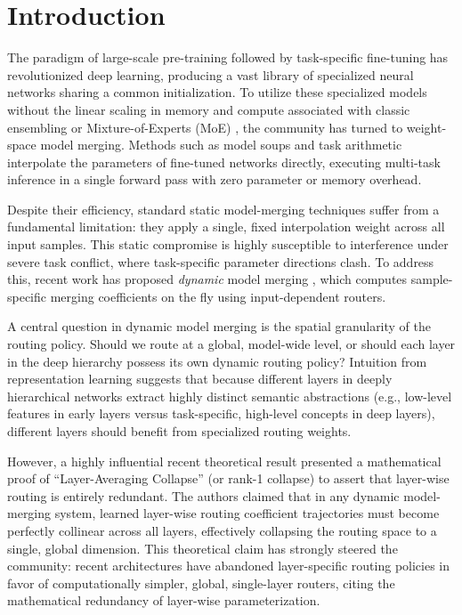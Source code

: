 \section{Introduction}
\label{sec:intro}

The paradigm of large-scale pre-training followed by task-specific fine-tuning has revolutionized deep learning, producing a vast library of specialized neural networks sharing a common initialization. To utilize these specialized models without the linear scaling in memory and compute associated with classic ensembling or Mixture-of-Experts (MoE) \cite{shazeer2017outrageously, fedus2022switch}, the community has turned to weight-space model merging. Methods such as model soups \cite{wortsman2022model} and task arithmetic \cite{ilharco2022editing} interpolate the parameters of fine-tuned networks directly, executing multi-task inference in a single forward pass with zero parameter or memory overhead.

Despite their efficiency, standard static model-merging techniques suffer from a fundamental limitation: they apply a single, fixed interpolation weight across all input samples. This static compromise is highly susceptible to interference under severe task conflict, where task-specific parameter directions clash. To address this, recent work has proposed \emph{dynamic} model merging \cite{gu2024zero, yadav2024resolving}, which computes sample-specific merging coefficients on the fly using input-dependent routers. 

A central question in dynamic model merging is the spatial granularity of the routing policy. Should we route at a global, model-wide level, or should each layer in the deep hierarchy possess its own dynamic routing policy? Intuition from representation learning suggests that because different layers in deeply hierarchical networks extract highly distinct semantic abstractions (e.g., low-level features in early layers versus task-specific, high-level concepts in deep layers), different layers should benefit from specialized routing weights. 

However, a highly influential recent theoretical result \cite{anonymous} presented a mathematical proof of ``Layer-Averaging Collapse'' (or rank-1 collapse) to assert that layer-wise routing is entirely redundant. The authors claimed that in any dynamic model-merging system, learned layer-wise routing coefficient trajectories must become perfectly collinear across all layers, effectively collapsing the routing space to a single, global dimension. This theoretical claim has strongly steered the community: recent architectures have abandoned layer-specific routing policies in favor of computationally simpler, global, single-layer routers, citing the mathematical redundancy of layer-wise parameterization.

